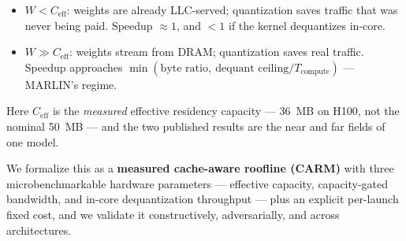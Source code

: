 \documentclass[10pt,twocolumn]{article}
\begin{document}
\begin{itemize}[leftmargin=*,topsep=2pt]
  \item $W < C_\text{eff}$: weights are already LLC-served; quantization saves traffic that was never being paid.  Speedup $\approx 1$, and $< 1$ if the kernel dequantizes in-core.
  \item $W \gg C_\text{eff}$: weights stream from DRAM; quantization saves real traffic.  Speedup approaches $\min(\text{byte ratio},\ \text{dequant ceiling}/T_\text{compute})$ --- MARLIN's regime.
\end{itemize}

\noindent Here $C_\text{eff}$ is the \emph{measured} effective residency capacity --- 36~MB on H100, not the nominal 50~MB --- and the two published results are the near and far fields of one model.

We formalize this as a \textbf{measured cache-aware roofline (CARM)} with three microbenchmarkable hardware parameters --- effective capacity, capacity-gated bandwidth, and in-core dequantization throughput --- plus an explicit per-launch fixed cost, and we validate it constructively, adversarially, and across architectures.
\end{document}
